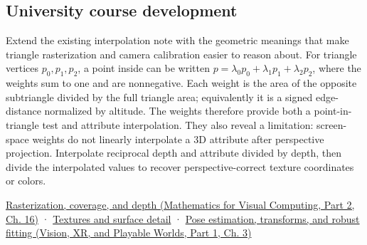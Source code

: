 \subsection{University course development}\label{appendix-02b9d9a81dca-university-course-development}

\hypertarget{appendix-02b9d9a81dca-university-course-development}{}

Extend the existing interpolation note with the geometric meanings that make triangle rasterization and camera calibration easier to reason about. For triangle vertices \(p_0,p_1,p_2\), a point inside can be written \(p=\lambda_0p_0+\lambda_1p_1+\lambda_2p_2\), where the weights sum to one and are nonnegative. Each weight is the area of the opposite subtriangle divided by the full triangle area; equivalently it is a signed edge-distance normalized by altitude. The weights therefore provide both a point-in-triangle test and attribute interpolation. They also reveal a limitation: screen-space weights do not linearly interpolate a 3D attribute after perspective projection. Interpolate reciprocal depth and attribute divided by depth, then divide the interpolated values to recover perspective-correct texture coordinates or colors.

\href{../02-Mathematics-for-Visual-Computing-P02/main.pdf\#03-visual-computing-i-ch012-rasterization-coverage-and-depth}{Rasterization, coverage, and depth (Mathematics for Visual Computing, Part 2, Ch. 16)} · \hyperref[03-visual-computing-i-ch019-textures-and-surface-detail]{Textures and surface detail} · \href{../07-Vision-XR-and-Playable-Worlds-P01/main.pdf\#04-visual-computing-ii-ch032-pose-estimation-transforms-and-robust-fitting}{Pose estimation, transforms, and robust fitting (Vision, XR, and Playable Worlds, Part 1, Ch. 3)}

